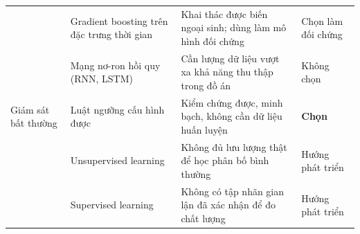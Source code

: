 \begin{longtable}{L{2.60cm} L{3.74cm} L{4.67cm} L{3.53cm}}
& Gradient boosting trên đặc trưng thời gian & Khai thác được biến ngoại sinh; dùng làm mô hình đối chứng & Chọn làm đối chứng \\
& Mạng nơ-ron hồi quy (RNN, LSTM) & Cần lượng dữ liệu vượt xa khả năng thu thập trong đồ án & Không chọn \\
Giám sát bất thường & Luật ngưỡng cấu hình được & Kiểm chứng được, minh bạch, không cần dữ liệu huấn luyện & \textbf{Chọn} \\
& Unsupervised learning & Không đủ lưu lượng thật để học phân bố bình thường & Hướng phát triển \\
& Supervised learning & Không có tập nhãn gian lận đã xác nhận để đo chất lượng & Hướng phát triển \\
\end{longtable}
\endgroup
